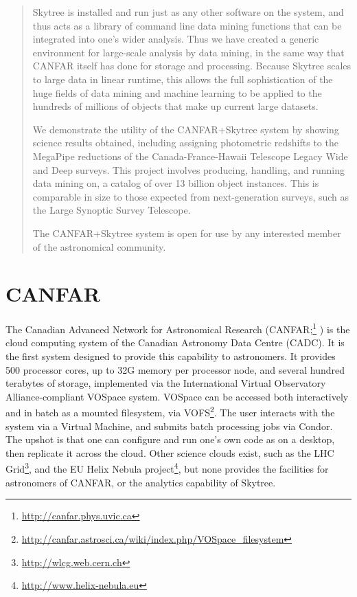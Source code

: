 \begin{abstract}
Skytree is installed and run just as any other software on the system, and thus acts as a library of command line data mining functions that can be integrated into one's wider analysis. Thus we have created a generic environment for large-scale analysis by data mining, in the same way that CANFAR itself has done for storage and processing. Because Skytree scales to large data in linear runtime, this allows the full sophistication of the huge fields of data mining and machine learning to be applied to the hundreds of millions of objects that make up current large datasets.

We demonstrate the utility of the CANFAR+Skytree system by showing science results obtained, including assigning photometric redshifts to the MegaPipe reductions of the Canada-France-Hawaii Telescope Legacy Wide and Deep surveys. This project involves producing, handling, and running data mining on, a catalog of over 13 billion object instances. This is comparable in size to those expected from next-generation surveys, such as the Large Synoptic Survey Telescope.

The CANFAR+Skytree system is open for use by any interested member of the astronomical community.
\end{abstract}

\section{CANFAR} \label{Sec: CANFAR}

The Canadian Advanced Network for Astronomical Research (CANFAR;\footnote{\url{http://canfar.phys.uvic.ca}} \citeauthor{gaudet:canfar} \citeyear{gaudet:canfar}) is the cloud computing system of the Canadian Astronomy Data Centre (CADC). It is the first system designed to provide this capability to astronomers. It provides 500 processor cores, up to 32G memory per processor node, and several hundred terabytes of storage, implemented via the International Virtual Observatory Alliance-compliant VOSpace system. VOSpace can be accessed both interactively and in batch as a mounted filesystem, via VOFS\footnote{\url{http://canfar.astrosci.ca/wiki/index.php/VOSpace_filesystem}}. The user interacts with the system via a Virtual Machine, and submits batch processing jobs via Condor. The upshot is that one can configure and run one's own code as on a desktop, then replicate it across the cloud. Other science clouds exist, such as the LHC Grid\footnote{\url{http://wlcg.web.cern.ch}}, and the EU Helix Nebula project\footnote{\url{http://www.helix-nebula.eu}}, but none provides the facilities for astronomers of CANFAR, or the analytics capability of Skytree.

